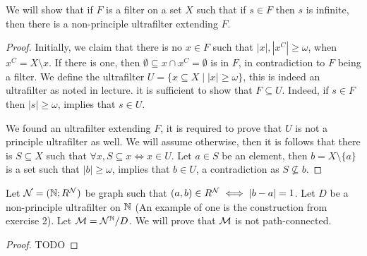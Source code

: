 \question{}
We will show that if $F$ is a filter on a set $X$ such that if $s \in F$ then $s$ is infinite, then there is a non-principle ultrafilter extending $F$.
\begin{proof}
	Initially, we claim that there is no $x \in F$ such that $|x|, |x^C| \ge \omega$, when $x^C = X \setminus x$.
	If there is one, then $\emptyset \subseteq x \cap x^C = \emptyset$ is in $F$, in contradiction to $F$ being a filter.
	We define the ultrafilter $U = \{ x \subseteq X \mid |x| \ge \omega \}$, this is indeed an ultrafilter as noted in lecture.
	it is sufficient to show that $F \subseteq U$.
	Indeed, if $s \in F$ then $|s| \ge \omega$, implies that $s \in U$.

	We found an ultrafilter extending $F$, it is required to prove that $U$ is not a principle ultrafilter as well.
	We will assume otherwise, then it is follows that there is $S \subseteq X$ such that $\forall x, S \subseteq x \iff x \in U$.
	Let $a \in S$ be an element, then $b = X \setminus \{a\}$ is a set such that $|b| \ge \omega$, implies that $b \in U$, a contradiction as $S \not\subseteq b$.
\end{proof}

\question{}
\subquestion{}
Let $\mathcal{N} = (\mathbb{N}; R^{\mathcal{N}})$ be graph such that $(a, b) \in R^{\mathcal{N}} \iff |b - a| = 1$.
Let $D$ be a non-principle ultrafilter on $\mathbb{N}$ (An example of one is the construction from exercise 2).
Let $\mathcal{M} = \mathcal{N}^{\mathbb{N}} / D$.
We will prove that $\mathcal{M}$ is not path-connected.
\begin{proof}
	TODO
\end{proof}


